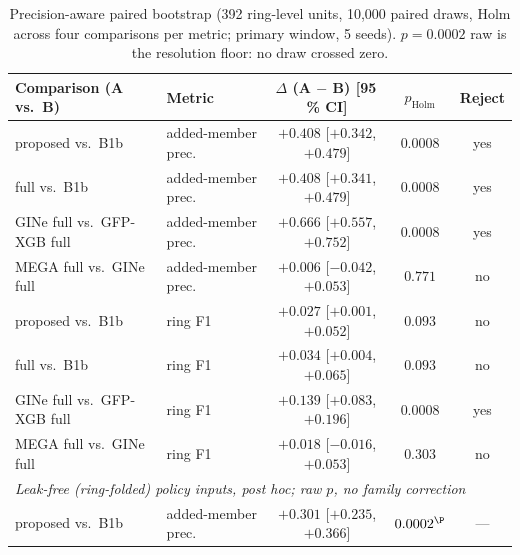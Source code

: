 \begin{table}[t]
\centering
\caption{Precision-aware paired bootstrap (392 ring-level units, 10{,}000 paired draws, Holm
across four comparisons per metric; primary window, 5 seeds). $p = 0.0002$ raw is the
resolution floor: no draw crossed zero.}
\label{tab:precision-paired}
\small
\begin{tabular}{llccc}
\toprule
Comparison (A vs.\ B) & Metric & $\Delta$ (A $-$ B) [95\,\% CI] & $p_{\mathrm{Holm}}$ & Reject \\
\midrule
proposed vs.\ B1b & added-member prec. & $+0.408$ [$+0.342$, $+0.479$] & $0.0008$ & yes \\ %
full vs.\ B1b & added-member prec. & $+0.408$ [$+0.341$, $+0.479$] & $0.0008$ & yes \\ %
GINe full vs.\ GFP-XGB full & added-member prec. & $+0.666$ [$+0.557$, $+0.752$] & $0.0008$ & yes \\ %
MEGA full vs.\ GINe full & added-member prec. & $+0.006$ [$-0.042$, $+0.053$] & $0.771$ & no \\ %
\midrule
proposed vs.\ B1b & ring F1 & $+0.027$ [$+0.001$, $+0.052$] & $0.093$ & no \\ %
full vs.\ B1b & ring F1 & $+0.034$ [$+0.004$, $+0.065$] & $0.093$ & no \\ %
GINe full vs.\ GFP-XGB full & ring F1 & $+0.139$ [$+0.083$, $+0.196$] & $0.0008$ & yes \\ %
MEGA full vs.\ GINe full & ring F1 & $+0.018$ [$-0.016$, $+0.053$] & $0.303$ & no \\ %
\midrule
\multicolumn{5}{l}{\emph{Leak-free (ring-folded) policy inputs, post hoc; raw $p$, no family correction}}\\
proposed vs.\ B1b & added-member prec. & $+0.301$ [$+0.235$, $+0.366$] & $0.0002^{\P}$ & --- \\ %

\end{tabular}
\end{table}
